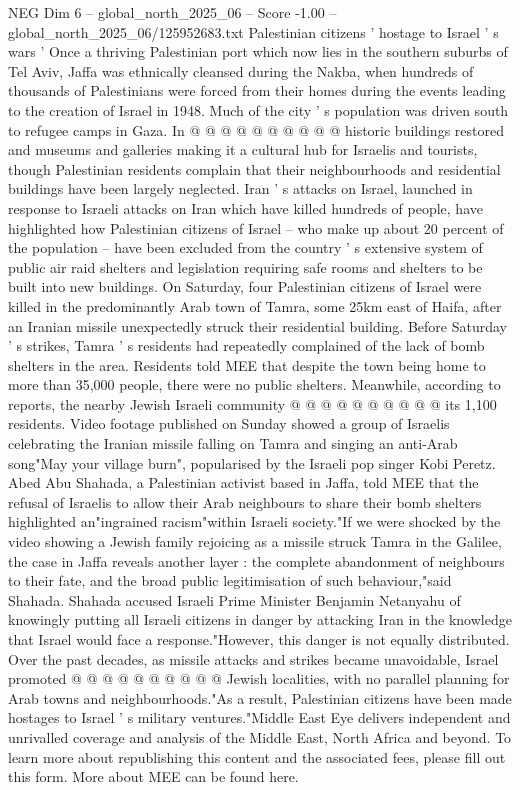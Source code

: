 \begin{textsample}{NEG Dim 6 – global\_north\_2025\_06 – Score -1.00 – global\_north\_2025\_06/125952683.txt}
Palestinian citizens ' hostage to Israel ' s wars ' Once a thriving Palestinian port which now lies in the southern suburbs of Tel Aviv, Jaffa was ethnically cleansed during the Nakba, when hundreds of thousands of Palestinians were forced from their homes during the events leading to the creation of Israel in 1948.
Much of the city ' s population was driven south to refugee camps in Gaza.
In @ @ @ @ @ @ @ @ @ @ historic buildings restored and museums and galleries making it a cultural hub for Israelis and tourists, though Palestinian residents complain that their neighbourhoods and residential buildings have been largely neglected.
Iran ' s attacks on Israel, launched in response to Israeli attacks on Iran which have killed hundreds of people, have highlighted how Palestinian citizens of Israel -- who make up about 20 percent of the population -- have been excluded from the country ' s extensive system of public air raid shelters and legislation requiring safe rooms and shelters to be built into new buildings.
On Saturday, four Palestinian citizens of Israel were killed in the predominantly Arab town of Tamra, some 25km east of Haifa, after an Iranian missile unexpectedly struck their residential building.
Before Saturday ' s strikes, Tamra ' s residents had repeatedly complained of the lack of bomb shelters in the area.
Residents told MEE that despite the town being home to more than 35,000 people, there were no public shelters.
Meanwhile, according to reports, the nearby Jewish Israeli community @ @ @ @ @ @ @ @ @ @ its 1,100 residents.
Video footage published on Sunday showed a group of Israelis celebrating the Iranian missile falling on Tamra and singing an anti-Arab song"May your village burn", popularised by the Israeli pop singer Kobi Peretz.
Abed Abu Shahada, a Palestinian activist based in Jaffa, told MEE that the refusal of Israelis to allow their Arab neighbours to share their bomb shelters highlighted an"ingrained racism"within Israeli society."If we were shocked by the video showing a Jewish family rejoicing as a missile struck Tamra in the Galilee, the case in Jaffa reveals another layer : the complete abandonment of neighbours to their fate, and the broad public legitimisation of such behaviour,"said Shahada.
Shahada accused Israeli Prime Minister Benjamin Netanyahu of knowingly putting all Israeli citizens in danger by attacking Iran in the knowledge that Israel would face a response."However, this danger is not equally distributed.
Over the past decades, as missile attacks and strikes became unavoidable, Israel promoted @ @ @ @ @ @ @ @ @ @ Jewish localities, with no parallel planning for Arab towns and neighbourhoods."As a result, Palestinian citizens have been made hostages to Israel ' s military ventures."Middle East Eye delivers independent and unrivalled coverage and analysis of the Middle East, North Africa and beyond.
To learn more about republishing this content and the associated fees, please fill out this form.
More about MEE can be found here.

\end{textsample}
